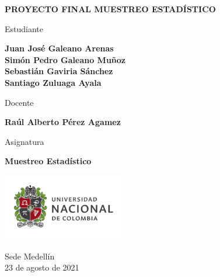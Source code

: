\begin{titlepage}
   \Large{
   \begin{center}
       \vspace*{1cm}

       \textbf{PROYECTO FINAL MUESTREO ESTADÍSTICO}

            
       \vspace{1.5cm}
       
       Estudiante
       
       \vspace{0.5cm}
        
        
       \textbf{Juan José Galeano Arenas} \\
       \textbf{Simón Pedro Galeano Muñoz} \\
       \textbf{Sebastián Gaviria Sánchez} \\
       \textbf{Santiago Zuluaga Ayala} \\
       
              \vspace{1cm}
       
       Docente
       
       \vspace{0.5cm}

       \textbf{Raúl Alberto Pérez Agamez}
       
       \vspace{0.4cm}

       \vspace{1.5cm}
       
       Asignatura
       
       \vspace{0.5cm}

       \textbf{Muestreo Estadístico}

       \vfill

            
       \vspace{0.4cm}
     
       \includegraphics[width=0.4\textwidth]{logounal.png}
            
       Sede Medellín\\
       23 de agosto de 2021
       
   \end{center}
   }
\end{titlepage}